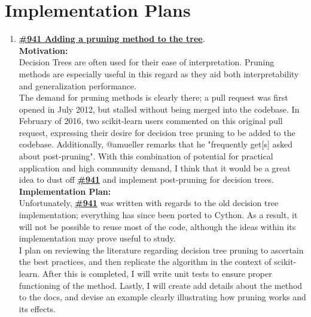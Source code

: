 \documentclass[12pt, oneside]{article}
\begin{document}
\section{Implementation Plans}
\begin{enumerate}
  \item
  \textbf{\href{https://github.com/scikit-learn/scikit-learn/pull/941}
    {\#941 Adding a pruning method to the tree}}.\\
  \textbf{Motivation:}\\
  Decision Trees are often used for their ease of
  interpretation. Pruning methods are especially useful in this regard
  as they aid both interpretability and generalization performance.\\
  The demand for pruning methods is clearly there; a pull request was
  first opened in July 2012, but stalled without being merged into the
  codebase. In February of 2016, two scikit-learn users commented on
  this original pull request, expressing their desire for decision
  tree pruning to be added to the codebase. Additionally, @amueller
  remarks that he "frequently get[s] asked about post-pruning". With
  this combination of potential for practical application and high
  community demand, I think that it would be a great idea to dust off
  \textbf{\href{https://github.com/scikit-learn/scikit-learn/pull/941}
    {\#941}} and implement post-pruning for decision trees.
  \textbf{Implementation Plan:}\\
  Unfortunately,
  \textbf{\href{https://github.com/scikit-learn/scikit-learn/pull/941}
    {\#941}} was written with regards to the old decision tree
  implementation; everything has since been ported to Cython. As a
  result, it will not be possible to reuse most of the code, although
  the ideas within its implementation may prove useful to study.\\
  I plan on reviewing the literature regarding decision tree pruning
  to ascertain the best practices, and then replicate the algorithm in
  the context of scikit-learn. After this is completed, I will write
  unit tests to ensure proper functioning of the method. Lastly, I
  will create add details about the method to the docs, and devise an
  example clearly illustrating how pruning works and its effects.
  

\end{enumerate}
\end{document}
